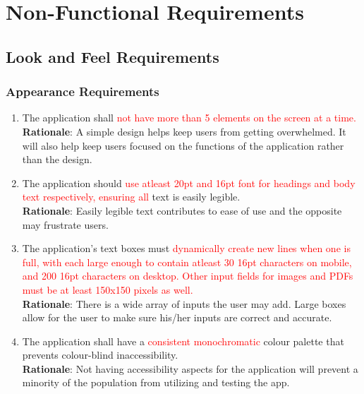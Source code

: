 \section{Non-Functional Requirements}
\label{sec:non-functional_requirements}


\subsection{Look and Feel Requirements}
\label{sub:look_and_feel_requirements}


\subsubsection{Appearance Requirements}
\label{ssub:appearance_requirements}
\begin{enumerate}[{LF-A}1. ]
	\item The application shall \textcolor{red}{not have more than 5 elements on the screen at a time.}
	\\ \textbf{Rationale}: A simple design helps keep users from getting overwhelmed. It will also help keep users focused on the 
	functions of the application rather than the design.
	\item The application should \textcolor{red}{use atleast 20pt and 16pt font for headings and body text respectively, ensuring all }text is easily legible.
	\\ \textbf{Rationale}: Easily legible text contributes to ease of use and the opposite may frustrate users.
	\item The application's text boxes must \textcolor{red}{dynamically create new lines when one is full, with each large enough to contain atleast 30 16pt characters on mobile, and 200 16pt characters on desktop. Other input fields for images and PDFs must be at least 150x150 pixels as well.}
	\\ \textbf{Rationale}: There is a wide array of inputs the user may add. Large boxes allow for the user to make sure his/her inputs are correct and accurate.
	\item The application shall have a \textcolor{red}{consistent monochromatic} colour palette that prevents colour-blind inaccessibility.
	\\ \textbf{Rationale}: Not having accessibility aspects for the application will prevent a minority of the population from utilizing and testing the app.  
\end{enumerate}


